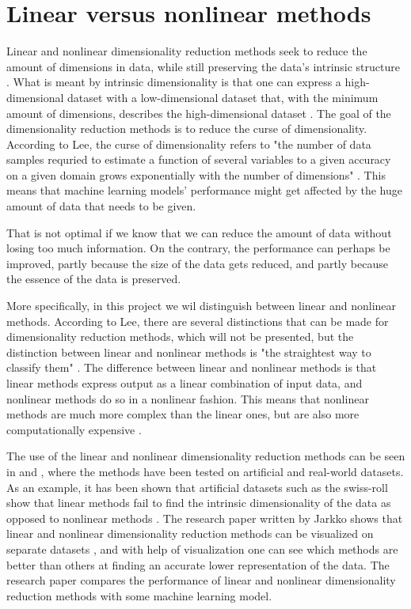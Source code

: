 \section{Linear versus nonlinear methods}\label{sec:linear-vs-nonlinear}
Linear and nonlinear dimensionality reduction methods seek to reduce the amount of dimensions in data, while still preserving the data's intrinsic structure \cite{nonlinear-dim-red-chapter-one}. What is meant by intrinsic dimensionality is that one can express a high-dimensional dataset with a low-dimensional dataset that, with the minimum amount of dimensions, describes the high-dimensional dataset \cite{dimensionality-reduction-comparative-review} \cite{nonlinear-dim-red-chapter-three}. The goal of the dimensionality reduction methods is to reduce the curse of dimensionality. According to Lee, the curse of dimensionality refers to "the number of data samples requried to estimate a function of several variables to a given accuracy on a given domain grows exponentially with the number of dimensions" \cite{nonlinear-dim-red-chapter-one}. This means that machine learning models' performance might get affected by the huge amount of data that needs to be given.


That is not optimal if we know that we can reduce the amount of data without losing too much information. On the contrary, the performance can perhaps be improved, partly because the size of the data gets reduced, and partly because the essence of the data is preserved. 


More specifically, in this project we wil distinguish between linear and nonlinear methods. According to Lee, there are several distinctions that can be made for dimensionality reduction methods, which will not be presented, but the distinction between linear and nonlinear methods is "the straightest way to classify them" \cite{nonlinear-dim-red-chapter-two}. The difference between linear and nonlinear methods is that linear methods express output as a linear combination of input data, and nonlinear methods do so in a nonlinear fashion. This means that nonlinear methods are much more complex than the linear ones, but are also more computationally expensive \cite{nonlinear-dim-red-chapter-two}. 


The use of the linear and nonlinear dimensionality reduction methods can be seen in \cite{dimensionality-reduction-comparative-review} and \cite{tennenbaum}, where the methods have been tested on artificial and real-world datasets. As an example, it has been shown that artificial datasets such as the swiss-roll show that linear methods fail to find the intrinsic dimensionality of the data as opposed to nonlinear methods \cite{tennenbaum}. The research paper written by Jarkko shows that linear and nonlinear dimensionality reduction methods can be visualized on separate datasets \cite{dim-red-visual}, and with help of visualization one can see which methods are better than others at finding an accurate lower representation of the data. The research paper \cite{dimensionality-reduction-comparative-review} compares the performance of linear and nonlinear dimensionality reduction methods with some machine learning model.


